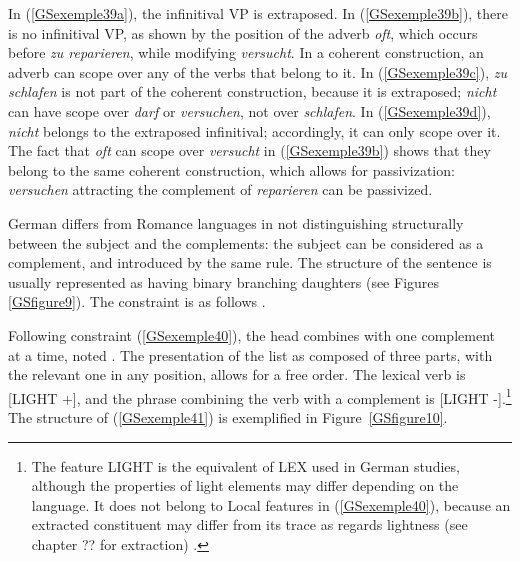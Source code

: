 \documentclass[output=paper
                ,modfonts
                ,nonflat
	        ,collection
	        ,collectionchapter
	        ,collectiontoclongg
 	        ,biblatex
                ,babelshorthands
                ,newtxmath
                ,draftmode
                ,colorlinks, citecolor=brown
]{./langsci/langscibook}
\begin{document}
{In (\ref{GSexemple39a}), the infinitival VP is extraposed. In (\ref{GSexemple39b}), there is no infinitival VP, as shown by the position of the adverb \textit{oft}, which occurs before \textit{zu reparieren}, while modifying \textit{versucht}. In a coherent construction, an adverb can scope over any of the verbs that belong to it. In (\ref{GSexemple39c}), \textit{zu schlafen} is not part of the coherent construction, because it is extraposed; \textit{nicht} can have scope over \textit{darf} or \textit{versuchen}, not over \textit{schlafen}. In (\ref{GSexemple39d}), \textit{nicht} belongs to the extraposed infinitival; accordingly, it can only scope over it. The fact that \textit{oft} can scope over \textit{versucht} in (\ref{GSexemple39b}) shows that they belong to the same coherent construction, which allows for passivization: \textit{versuchen} attracting the complement of \textit{reparieren} can be passivized.

German differs from Romance languages in not distinguishing structurally between the subject and the complements: the subject can be considered as a complement, and introduced by the same rule. The structure of the sentence is usually represented as having binary branching daughters (see Figures \ref{GSfigure9}). The constraint is as follows \citep{muller2018clause}.

\begin{exe}
\end{exe}

Following constraint (\ref{GSexemple40}), the head combines with one complement at a time, noted . The presentation of the list as composed of three parts, with the relevant one in any position, allows for a free order. The lexical verb is [LIGHT +], and the phrase combining the verb with a complement is [LIGHT -].\footnote{The feature LIGHT is the equivalent of LEX used in German studies, although the properties of light elements may differ depending on the language. It does not belong to Local features in (\ref{GSexemple40}), because an extracted constituent may differ from its trace as regards lightness (see chapter ?? for extraction) \citep{muller2018clause}.} The structure of (\ref{GSexemple41}) is exemplified in Figure~\ref{GSfigure10}.

}
\end{document}
